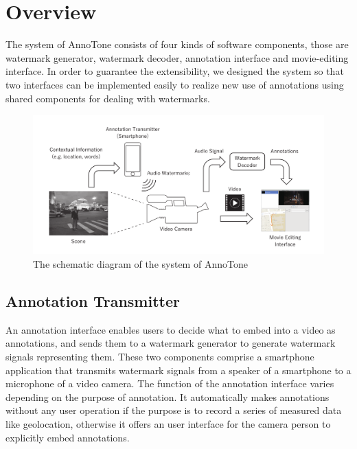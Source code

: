 \chapter{Overview}

The system of AnnoTone consists of four kinds of software components, those are watermark generator, watermark decoder, annotation interface and movie-editing interface.
In order to guarantee the extensibility, we designed the system so that two interfaces can be implemented easily to realize new use of annotations using shared components for dealing with watermarks.

\begin{figure}[htbp]
 \begin{center}
  \vspace{5mm}
  \includegraphics[width=150mm]{overview.pdf}
 \end{center}
 \caption{The schematic diagram of the system of AnnoTone}
 \label{fig:one}
\end{figure}

\section{Annotation Transmitter}
An annotation interface enables users to decide what to embed into a video as annotations, and sends them to a watermark generator to generate watermark signals representing them.
These two components comprise a smartphone application that transmits watermark signals from a speaker of a smartphone to a microphone of a video camera.
The function of the annotation interface varies depending on the purpose of annotation.
It automatically makes annotations without any user operation if the purpose is to record a series of measured data like geolocation, otherwise it offers an user interface for the camera person to explicitly embed annotations.

